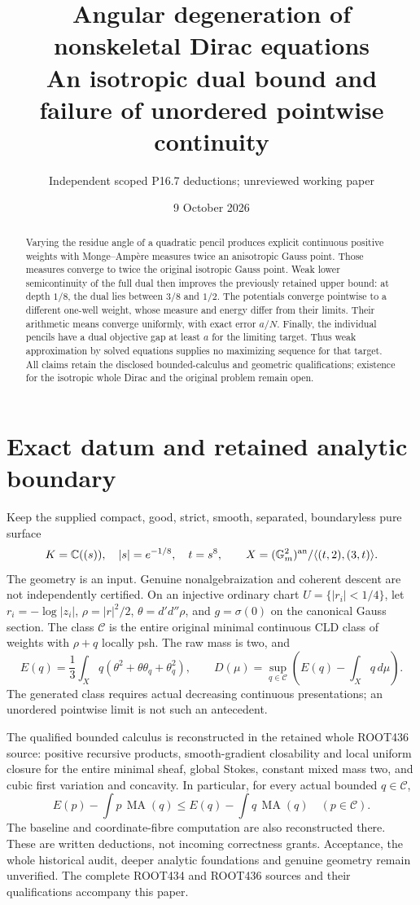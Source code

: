 \documentclass[11pt]{article}
\title{Angular degeneration of nonskeletal Dirac equations\\
An isotropic dual bound and failure of unordered pointwise continuity}
\author{Independent scoped P16.7 deductions; unreviewed working paper}
\date{9 October 2026}
\newcommand{\DD}{d'd''}
\newcommand{\MA}{\operatorname{MA}}
\newcommand{\C}{\mathcal C}
\begin{document}
\maketitle
\begin{abstract}
Varying the residue angle of a quadratic pencil produces explicit
continuous positive weights with Monge--Amp\`ere measures twice an
anisotropic Gauss point. Those measures converge to twice the original
isotropic Gauss point. Weak lower semicontinuity of the full dual then
improves the previously retained upper bound: at depth $1/8$, the dual
lies between $3/8$ and $1/2$. The potentials converge pointwise to a
different one-well weight, whose measure and energy differ from their
limits. Their arithmetic means converge uniformly, with exact error
$a/N$. Finally, the individual pencils have a dual objective gap at
least $a$ for the limiting target. Thus weak approximation by solved
equations supplies no maximizing sequence for that target. All claims
retain the disclosed bounded-calculus and geometric qualifications;
existence for the isotropic whole Dirac and the original problem remain open.
\end{abstract}

\section{Exact datum and retained analytic boundary}
Keep the supplied compact, good, strict, smooth, separated, boundaryless
pure surface
\[
 K=\mathbb C((s)),\quad |s|=e^{-1/8},\quad t=s^8,\qquad
 X=(\mathbb G_m^2)^{\rm an}/\langle(t,2),(3,t)\rangle.
\]
The geometry is an input. Genuine nonalgebraization and coherent descent
are not independently certified. On an injective ordinary chart
$U=\{|r_i|<1/4\}$, let $r_i=-\log|z_i|$, $\rho=|r|^2/2$,
$\theta=\DD\rho$, and $g=\sigma(0)$ on the canonical Gauss section.
The class $\C$ is the entire original minimal continuous CLD class of
weights with $\rho+q$ locally psh. The raw mass is two, and
\[
 E(q)=\frac13\int_Xq(\theta^2+\theta\theta_q+\theta_q^2),\qquad
 D(\mu)=\sup_{q\in\C}\left(E(q)-\int_Xq\,d\mu\right).
\]
The generated class requires actual decreasing continuous presentations;
an unordered pointwise limit is not such an antecedent.

The qualified bounded calculus is reconstructed in the retained whole
ROOT436 source: positive recursive products, smooth-gradient closability
and local uniform closure for the entire minimal sheaf, global Stokes,
constant mixed mass two, and cubic first variation and concavity. In
particular, for every actual bounded $q\in\C$,
\[
 E(p)-\int p\,\MA(q)\le E(q)-\int q\,\MA(q)\quad(p\in\C).       \tag{1}
\]
The baseline and coordinate-fibre computation are also reconstructed there.
These are written deductions, not incoming correctness grants. Acceptance,
the whole historical audit, deeper analytic foundations and genuine
geometry remain unverified. The complete ROOT434 and ROOT436 sources and
their qualifications accompany this paper.
\end{document}
